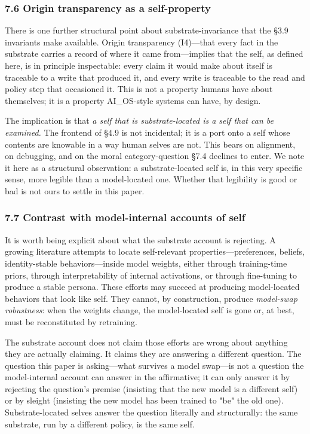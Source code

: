 \documentclass[11pt,letterpaper]{article}
\begin{document}
\subsubsection*{7.6 Origin transparency as a self-property}

There is one further structural point about substrate-invariance that the §3.9 invariants make available. Origin transparency (I4)---that every fact in the substrate carries a record of where it came from---implies that the self, as defined here, is in principle inspectable: every claim it would make about itself is traceable to a write that produced it, and every write is traceable to the read and policy step that occasioned it. This is not a property humans have about themselves; it is a property AI\_OS-style systems can have, by design.

The implication is that \emph{a self that is substrate-located is a self that can be examined.} The frontend of §4.9 is not incidental; it is a port onto a self whose contents are knowable in a way human selves are not. This bears on alignment, on debugging, and on the moral category-question §7.4 declines to enter. We note it here as a structural observation: a substrate-located self is, in this very specific sense, more legible than a model-located one. Whether that legibility is good or bad is not ours to settle in this paper.

\subsubsection*{7.7 Contrast with model-internal accounts of self}

It is worth being explicit about what the substrate account is rejecting. A growing literature attempts to locate self-relevant properties---preferences, beliefs, identity-stable behaviors---inside model weights, either through training-time priors, through interpretability of internal activations, or through fine-tuning to produce a stable persona. These efforts may succeed at producing model-located behaviors that look like self. They cannot, by construction, produce \emph{model-swap robustness}: when the weights change, the model-located self is gone or, at best, must be reconstituted by retraining.

The substrate account does not claim those efforts are wrong about anything they are actually claiming. It claims they are answering a different question. The question this paper is asking---what survives a model swap---is not a question the model-internal account can answer in the affirmative; it can only answer it by rejecting the question's premise (insisting that the new model is a different self) or by sleight (insisting the new model has been trained to "be" the old one). Substrate-located selves answer the question literally and structurally: the same substrate, run by a different policy, is the same self.
\end{document}
